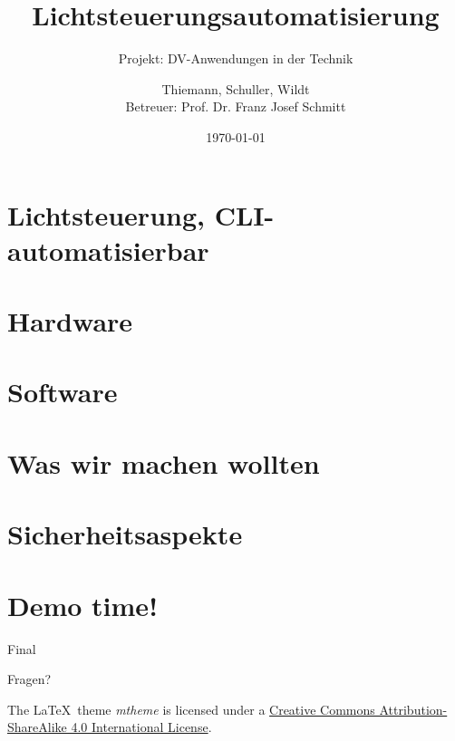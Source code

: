 \documentclass[10pt, compress]{beamer}
\title{Lichtsteuerungsautomatisierung}
\subtitle{Projekt: DV-Anwendungen in der Technik}
\date{\today}
\author{Thiemann, Schuller, Wildt\\
  Betreuer: Prof. Dr. Franz Josef Schmitt}
\institute{Hochschule Rosenheim}
\begin{document}
\maketitle

\section{Lichtsteuerung, CLI-automatisierbar}



\section{Hardware}



\section{Software}



\section{Was wir machen wollten}



\section{Sicherheitsaspekte}



\section{Demo time!}



\begin{frame}{Final}

  \begin{center}\huge Fragen?\end{center}
    
  \vspace{1cm}
  \begin{center}
  {\small

  The \LaTeX \ theme \emph{mtheme} is licensed under a
  \href{http://creativecommons.org/licenses/by-sa/4.0/}{Creative Commons
  Attribution-ShareAlike 4.0 International License}.}

  \ccbysa
  
  \end{center}

\end{frame}
\end{document}
